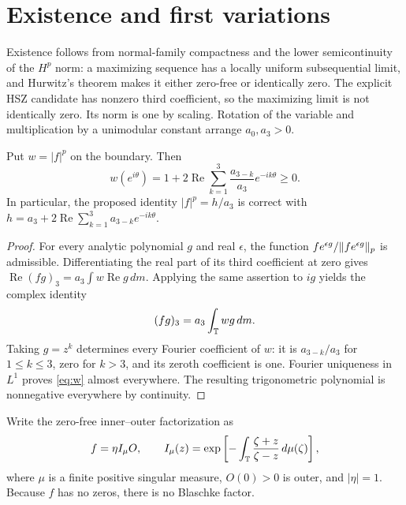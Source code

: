 \section{Existence and first variations}

Existence follows from normal-family compactness and the lower semicontinuity
of the $H^p$ norm: a maximizing sequence has a locally uniform subsequential
limit, and Hurwitz's theorem makes it either zero-free or identically zero.
The explicit HSZ candidate has nonzero third coefficient, so the maximizing
limit is not identically zero. Its norm is one by scaling. Rotation of the
variable and multiplication by a unimodular constant arrange $a_0,a_3>0$.

\begin{lemma}
Put $w=|f|^p$ on the boundary. Then
\begin{equation}\label{eq:w}
 w(e^{i\theta})=1+2\operatorname{Re}\sum_{k=1}^3
       \frac{a_{3-k}}{a_3}e^{-ik\theta}\geq0.
\end{equation}
In particular, the proposed identity $|f|^p=h/a_3$ is correct with
$h=a_3+2\operatorname{Re}\sum_{k=1}^3 a_{3-k}e^{-ik\theta}$.
\end{lemma}
\begin{proof}
For every analytic polynomial $g$ and real $\epsilon$, the function
$f e^{\epsilon g}/\lVert f e^{\epsilon g}\rVert_p$ is admissible. Differentiating
the real part of its third coefficient at zero gives
$\operatorname{Re}(fg)_3=a_3\int w\operatorname{Re}g\,dm$.
Applying the same assertion to $ig$ yields the complex identity
\begin{equation}\label{eq:stationary}
 (fg)_3=a_3\int_{\mathbb T}w g\,dm.
\end{equation}
Taking $g=z^k$ determines every Fourier coefficient of $w$: it is
$a_{3-k}/a_3$ for $1\leq k\leq3$, zero for $k>3$, and its zeroth coefficient
is one. Fourier uniqueness in $L^1$ proves \eqref{eq:w} almost everywhere.
The resulting trigonometric polynomial is nonnegative everywhere by continuity.
\end{proof}

Write the zero-free inner--outer factorization as
\[
 f=\eta I_\mu O,\qquad
 I_\mu(z)=\exp\left[-\int_{\mathbb T}\frac{\zeta+z}{\zeta-z}\,d\mu(\zeta)\right],
\]
where $\mu$ is a finite positive singular measure, $O(0)>0$ is outer, and
$|\eta|=1$. Because $f$ has no zeros, there is no Blaschke factor.


